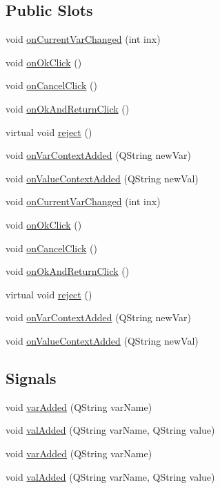 \subsection*{Public Slots}
\begin{DoxyCompactItemize}
\item 
void \hyperlink{class_expr_editor_ace6097f735f6f3828cfcfa4ab976dcb2}{onCurrentVarChanged} (int inx)
\item 
void \hyperlink{class_expr_editor_add1683227b73a387df7f92242e6f9e49}{onOkClick} ()
\item 
void \hyperlink{class_expr_editor_a83f4c96905d5f7df42f1cbfe0b0d5458}{onCancelClick} ()
\item 
void \hyperlink{class_expr_editor_a5ae8cf51b1d65c14c6581bcdb9c85027}{onOkAndReturnClick} ()
\item 
virtual void \hyperlink{class_expr_editor_a78d912cdfc95b50e4dfda9620df7e14e}{reject} ()
\item 
void \hyperlink{class_expr_editor_a095b233f3425980f76fa2cc0a4d02ee0}{onVarContextAdded} (QString newVar)
\item 
void \hyperlink{class_expr_editor_a948252a9f0716401b89fbfff4b19ac49}{onValueContextAdded} (QString newVal)
\item 
void \hyperlink{class_expr_editor_ace6097f735f6f3828cfcfa4ab976dcb2}{onCurrentVarChanged} (int inx)
\item 
void \hyperlink{class_expr_editor_add1683227b73a387df7f92242e6f9e49}{onOkClick} ()
\item 
void \hyperlink{class_expr_editor_a83f4c96905d5f7df42f1cbfe0b0d5458}{onCancelClick} ()
\item 
void \hyperlink{class_expr_editor_a5ae8cf51b1d65c14c6581bcdb9c85027}{onOkAndReturnClick} ()
\item 
virtual void \hyperlink{class_expr_editor_a52172f067cd9296e95d3ced2fc6af1a5}{reject} ()
\item 
void \hyperlink{class_expr_editor_a095b233f3425980f76fa2cc0a4d02ee0}{onVarContextAdded} (QString newVar)
\item 
void \hyperlink{class_expr_editor_a948252a9f0716401b89fbfff4b19ac49}{onValueContextAdded} (QString newVal)
\end{DoxyCompactItemize}
\subsection*{Signals}
\begin{DoxyCompactItemize}
\item 
void \hyperlink{class_expr_editor_a9287f32e4b659ea721cc64bc18431dee}{varAdded} (QString varName)
\item 
void \hyperlink{class_expr_editor_a26b2f380340bf8f0a3f78ea645f9fc9d}{valAdded} (QString varName, QString value)
\item 
void \hyperlink{class_expr_editor_a9287f32e4b659ea721cc64bc18431dee}{varAdded} (QString varName)
\item 
void \hyperlink{class_expr_editor_a26b2f380340bf8f0a3f78ea645f9fc9d}{valAdded} (QString varName, QString value)
\end{DoxyCompactItemize}
